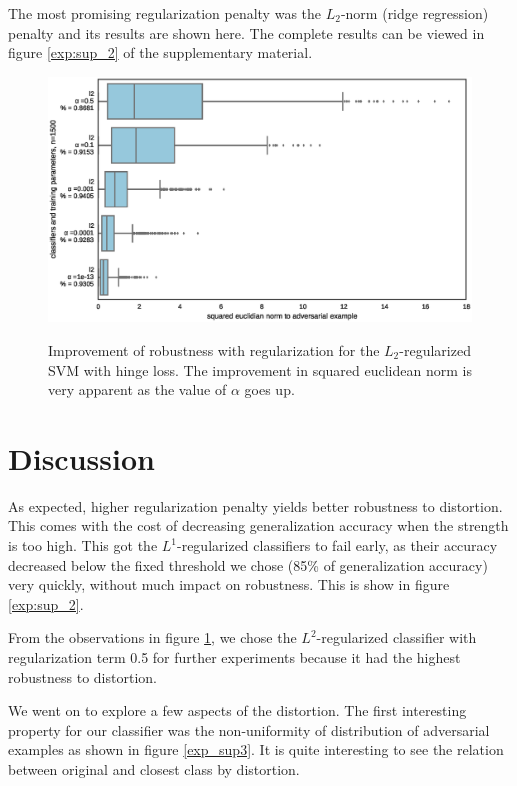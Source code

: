 \documentclass{article} %
\begin{document}
The most promising regularization penalty was the $L_2$-norm (ridge
regression) penalty and its results are shown here. 
The complete results can be viewed in figure \ref{exp:sup_2} of the supplementary material.

\begin{figure}[h!]
 \includegraphics[scale=0.5]{figs/experiment_2_l2}
 \label{res:exp2}
 \caption{\small Improvement of robustness with regularization for the $L_2$-regularized SVM with hinge loss. The improvement in squared euclidean norm is very apparent as the value of $\alpha$ goes up.}
\end{figure}




\section{Discussion}

As expected, higher regularization penalty yields better robustness to distortion. This comes with the cost of decreasing generalization accuracy when the strength is too high. This got the $L^1$-regularized classifiers to fail early, as their accuracy decreased below the fixed threshold we chose (85\% of generalization accuracy) very quickly, without much impact on robustness. This is show in figure \ref{exp:sup_2}.

From the observations in figure \ref{res:exp2}, we chose the $L^2$-regularized classifier with regularization term 0.5 for further experiments because it had the highest robustness to distortion.

We went on to explore a few aspects of the distortion. The first interesting property for our classifier was the non-uniformity of distribution of adversarial examples as shown in figure \ref{exp_sup3}. It is quite interesting to see the relation between original and closest class by distortion.
\end{document}
